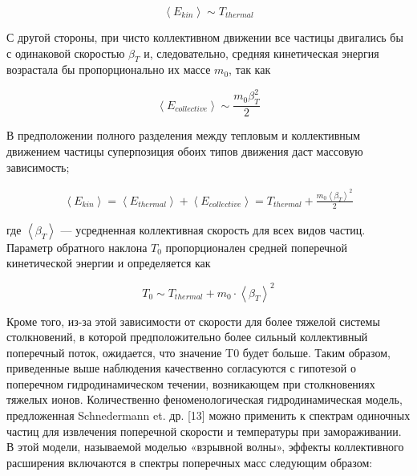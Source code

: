 \begin{equation}
	\left< E_{kin} \right>  \sim T_{thermal} 
\end{equation}

С другой стороны, при чисто коллективном движении все частицы двигались бы с одинаковой скоростью $\beta_T$ и, следовательно, средняя кинетическая энергия возрастала бы пропорционально их массе $m_0$, так как

\begin{equation}
	\left< E_{collective} \right>  \sim \frac{m_0\beta_T^2}{2}
\end{equation}

В предположении полного разделения между тепловым и коллективным движением частицы суперпозиция обоих типов движения даст массовую зависимость;

\begin{equation}
	\begin{split}
		\left< E_{kin} \right> = \left< E_{thermal} \right> + \left< E_{collective} \right> = T_{thermal} + \frac{m_0 \left< \beta_T \right>^2}{2} 
	\end{split}
\end{equation}

где $\left< \beta_T \right>$ — усредненная коллективная скорость для всех видов частиц. Параметр обратного наклона $T_0$ пропорционален средней поперечной кинетической энергии и определяется как

\begin{equation}
	T_0 \sim T_{thermal} + m_0 \cdot \left< \beta_T \right>^2
\end{equation}


Кроме того, из-за этой зависимости от скорости для более тяжелой системы столкновений, в которой предположительно более сильный коллективный поперечный поток, ожидается, что значение T0 будет больше. Таким образом, приведенные выше наблюдения качественно согласуются с гипотезой о поперечном гидродинамическом течении, возникающем при столкновениях тяжелых ионов. Количественно феноменологическая гидродинамическая модель, предложенная Schnedermann et. др. [13] можно применить к спектрам одиночных частиц для извлечения поперечной скорости и температуры при замораживании. В этой модели, называемой моделью «взрывной волны», эффекты коллективного расширения включаются в спектры поперечных масс следующим образом:

